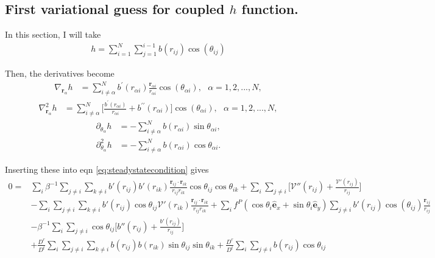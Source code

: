 \documentclass{article}
\begin{document}
\subsection{First variational guess for coupled $h$ function.}

In this section, I will take
\begin{align}
  h = \sum_{i=1}^N\sum_{j=1}^{i-1}b(r_{ij})\cos(\theta_{ij})
\end{align}

Then, the derivatives become
\begin{align}\label{eq:partial_i_h}
  \nabla_{\bm{r}_{\alpha}}h
  &=\sum_{i\neq\alpha}^Nb^{\prime}
    (r_{\alpha i})\frac{\bm{r}_{\alpha i}}{r_{\alpha i}}\cos(\theta_{\alpha i}),
    \:\:\:\alpha=1,2,...,N,
\end{align}
\begin{align}\label{eq:partialsq_i_h}
  \nabla_{\bm{r}_{\alpha}}^2h
  &=\sum_{i\neq\alpha}^N\bigg[\frac{b^{\prime}(r_{\alpha i})}{r_{\alpha i}}
    +b^{\prime\prime}(r_{\alpha i})\bigg]\cos(\theta_{\alpha i}),
    \:\:\:\alpha=1,2,...,N,
\end{align}
\begin{align}
  \partial_{\theta_{\alpha}}h
  &=-\sum_{i\neq\alpha}^Nb(r_{\alpha i})\sin\theta_{\alpha i},
\end{align}
\begin{align}
  \partial_{\theta_{\alpha}}^2h
  &=-\sum_{i\neq\alpha}^Nb(r_{\alpha i})\cos\theta_{\alpha i}.
\end{align}

Inserting these into eqn \ref{eq:steadystatecondition} gives
\begin{align}\label{eq:easiest_non_separable}
  0
  =&\sum_{i}\beta^{-1}\sum_{j\neq i}\sum_{k\neq i} b'(r_{ij})b'(r_{ik})
     \frac{\bm{r}_{ij}\cdot\bm{r}_{ik}}{r_{ij}r_{ik}}\cos\theta_{ij}\cos\theta_{ik}
     + \sum_i\sum_{j\neq i}\bigg[\mathcal{V}''(r_{ij})
     +\frac{\mathcal{V}'(r_{ij})}{r_{ij}}\bigg]\nonumber\\
   & - \sum_i\sum_{j\neq i}\sum_{k\neq i}
     b'(r_{ij})\cos\theta_{ij}\mathcal{V}'(r_{ik})
     \frac{\bm{r}_{ij}\cdot\bm{r}_{ik}}{r_{ij}r_{ik}}
     +\sum_i
     f^P(\cos\theta_i\hat{\bm{e}}_x+\sin\theta_i\hat{\bm{e}}_y)
     \sum_{j\neq i}b'(r_{ij})\cos(\theta_{ij})
     \frac{\bm{r}_{ij}}{r_{ij}}\nonumber\\
   & - \beta^{-1}\sum_i\sum_{j\neq i}\cos\theta_{ij}\bigg[b''(r_{ij})
     +\frac{b'(r_{ij})}{r_{ij}}\bigg]\nonumber\\
   & + \frac{D^r}{D^t}\sum_i\sum_{j\neq i}\sum_{k\neq i} b(r_{ij})b(r_{ik})
     \sin\theta_{ij}\sin\theta_{ik}
     +\frac{D^r}{D^t}\sum_i\sum_{j\neq i}b(r_{ij})\cos\theta_{ij}
\end{align}
\end{document}
